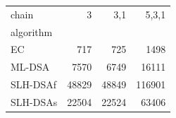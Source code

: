 \begin{tabular}{lrrr}
\toprule
chain & 3 & 3,1 & 5,3,1 \\
algorithm &  &  &  \\
\midrule
EC & 717 & 725 & 1498 \\
ML-DSA & 7570 & 6749 & 16111 \\
SLH-DSAf & 48829 & 48849 & 116901 \\
SLH-DSAs & 22504 & 22524 & 63406 \\
\bottomrule
\end{tabular}

